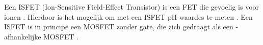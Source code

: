 Een ISFET (Ion-Sensitive Field-Effect Transistor) is een FET die gevoelig is voor ionen \cite{modeling,isfetAsAnElectronicDevice,bergveld1985impactOfMosfetBasedSensors,bergveld2003thirtyYearsISFET}. Hierdoor is het mogelijk om met een ISFET pH-waardes te meten \cite{modeling,isfetAsAnElectronicDevice,bergveld1985impactOfMosfetBasedSensors,bergveld2003thirtyYearsISFET}. Een ISFET is in principe een MOSFET zonder gate, die zich gedraagt als een \si{\pH}-afhankelijke MOSFET
\cite{isfetAsAnElectronicDevice,bergveld1985impactOfMosfetBasedSensors,bergveld2003thirtyYearsISFET}.

